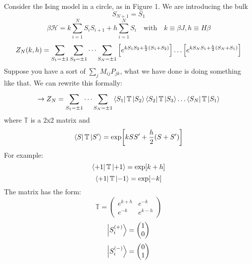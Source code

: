 \documentclass[../main/main.tex]{subfiles}
\begin{document}
Consider the Ising model in a circle, as in Figure 1.
We are introducing the bulk
\begin{equation}
  S_{N+1} = S_1
\end{equation}
\begin{equation}
  \beta \mathcal{H} = k \sum_{i=1}^{N} S_i S_{i+1} + h \sum_{i=1}^{N} S_i \quad \text{with} \quad k \equiv \beta J, h \equiv H \beta
\end{equation}
\begin{equation}
  Z_N (k,h) = \sum_{S_1 = \pm 1}^{} \sum_{S_2 = \pm 1}^{}  \dots \sum_{S_N = \pm 1}^{}
  \qty[e^{k S_1 S_2 + \frac{h}{2}(S_1+S_2)} ]\dots \qty[e^{k S_N S_1 + \frac{h}{2}(S_N+S_1)} ]
\end{equation}
Suppose you have a sort of \( \sum_{j}^{}  M_{ij} P_{jk} \), what we have done is doing something like that. We can rewrite this formally:
\begin{equation}
  \rightarrow Z_N = \sum_{S_1 = \pm 1}^{} \dots \sum_{S_N = \pm 1}^{} \bra{S_1} \mathbb{T} \ket{S_2} \bra{S_2}  \mathbb{T} \ket{S_3} \dots \bra{S_N}  \mathbb{T} \ket{S_1}
\end{equation}
where \( \mathbb{T} \) is a 2x2 matrix and
\begin{equation}
  \bra{S} \mathbb{T} \ket{S'} = \exp [k S S' + \frac{h}{2} (S+S')]
\end{equation}
For example:
\begin{equation}
  \bra{+1} \mathbb{T} \ket{+1} = \exp [k+h]
\end{equation}
\begin{equation}
  \bra{+1} \mathbb{T} \ket{-1} = \exp [-k]
\end{equation}
The matrix has the form:
\begin{equation}
  \mathbb{T} =
\begin{pmatrix}
e^{k+h}    & e^{-k}  \\
  e^{-k}  & e^{k-h}
\end{pmatrix}
\end{equation}
\begin{equation}
  \ket{S_i^{(+)}} = \begin{pmatrix}
  1 \\
  0
  \end{pmatrix}
\end{equation}
\begin{equation}
  \ket{S_i^{(-)}} = \begin{pmatrix}
  0 \\
  1
  \end{pmatrix}
\end{equation}
\end{document}
